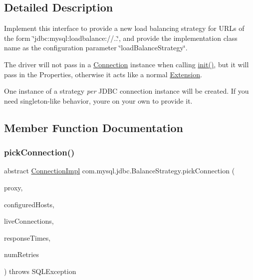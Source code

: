 \subsection{Detailed Description}
Implement this interface to provide a new load balancing strategy for U\+R\+Ls of the form \char`\"{}jdbc\+:mysql\+:loadbalance\+://..\char`\"{}, and provide the implementation class name as the configuration parameter \char`\"{}load\+Balance\+Strategy\char`\"{}.

The driver will not pass in a \mbox{\hyperlink{interfacecom_1_1mysql_1_1jdbc_1_1_connection}{Connection}} instance when calling \mbox{\hyperlink{interfacecom_1_1mysql_1_1jdbc_1_1_extension_a79427811058193260bd4df0c38414e88}{init()}}, but it will pass in the Properties, otherwise it acts like a normal \mbox{\hyperlink{interfacecom_1_1mysql_1_1jdbc_1_1_extension}{Extension}}.

One instance of a strategy {\itshape per} J\+D\+BC connection instance will be created. If you need singleton-\/like behavior, you\textquotesingle{}re on your own to provide it. 

\subsection{Member Function Documentation}
\mbox{\label{interfacecom_1_1mysql_1_1jdbc_1_1_balance_strategy_a9cebc8dcd86aaf1c7dcb458cc7755540}} 
\subsubsection{\texorpdfstring{pick\+Connection()}{pickConnection()}}
{\footnotesize\ttfamily abstract \mbox{\hyperlink{classcom_1_1mysql_1_1jdbc_1_1_connection_impl}{Connection\+Impl}} com.\+mysql.\+jdbc.\+Balance\+Strategy.\+pick\+Connection (\begin{DoxyParamCaption}\item[{\mbox{\hyperlink{classcom_1_1mysql_1_1jdbc_1_1_load_balanced_connection_proxy}{Load\+Balanced\+Connection\+Proxy}}}]{proxy,  }\item[{List$<$ String $>$}]{configured\+Hosts,  }\item[{Map$<$ String, \mbox{\hyperlink{classcom_1_1mysql_1_1jdbc_1_1_connection_impl}{Connection\+Impl}} $>$}]{live\+Connections,  }\item[{long \mbox{[}$\,$\mbox{]}}]{response\+Times,  }\item[{int}]{num\+Retries }\end{DoxyParamCaption}) throws S\+Q\+L\+Exception\hspace{0.3cm}{\ttfamily [abstract]}}


